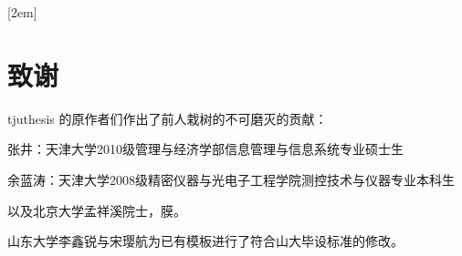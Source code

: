
[2em]{\vspace{.5\baselineskip}\xiaosan\song}
             {\prechaptername\CJKnumber{\thecontentslabel}\postchaptername\qquad}{} 
             {}                            %
\lhead{}
\rhead{}
\lfoot{}
\cfoot{}
\rfoot{}
\chapter*{\xiaoer\hei\textbf{致\qquad\qquad 谢}}
\setcounter{page}{1}
\begin{spacing}{1.5}
\xiaosi\song
tjuthesis 的原作者们作出了前人栽树的不可磨灭的贡献：

张井：天津大学2010级管理与经济学部信息管理与信息系统专业硕士生

余蓝涛：天津大学2008级精密仪器与光电子工程学院测控技术与仪器专业本科生

以及北京大学孟祥溪院士，膜。

山东大学李鑫锐与宋璎航为已有模板进行了符合山大毕设标准的修改。
\end{spacing}